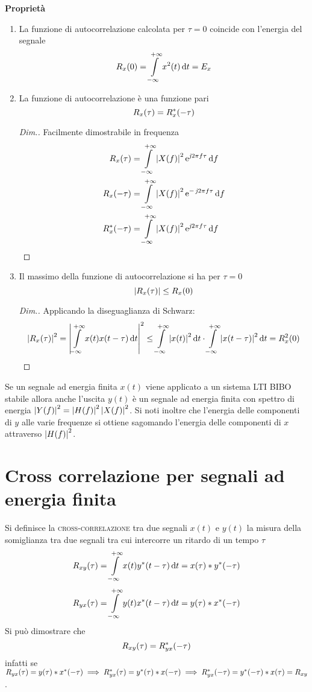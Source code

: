 \textbf{Proprietà}
\begin{enumerate}
\item La funzione di autocorrelazione calcolata per $\tau=0$ coincide con l'energia del segnale
\[
	R_x(0)=\int\limits_{-\infty}^{+\infty}{x^2(t)}{\,\mathop{}\!\mathrm{d}{t}}=E_x
\]

\item La funzione di autocorrelazione è una funzione pari
\[
	R_x(\tau)=R_{x}^\ast(-\tau)
\]
\begin{proof}[Dim.]
Facilmente dimostrabile in frequenza
\begin{align*}
	R_x(\tau)&=\int\limits_{-\infty}^{+\infty}{\left|{X(f)}\right|^2\operatorname{e}^{\operatorname{\mathit{j}\!} 2\pi f\tau}}{\,\mathop{}\!\mathrm{d}{f}}\\
	R_x(-\tau)&=\int\limits_{-\infty}^{+\infty}{\left|{X(f)}\right|^2\operatorname{e}^{-\operatorname{\mathit{j}\!} 2\pi f\tau}}{\,\mathop{}\!\mathrm{d}{f}}\\
	R_{x}^\ast(-\tau)&=\int\limits_{-\infty}^{+\infty}{\left|{X(f)}\right|^2\operatorname{e}^{\operatorname{\mathit{j}\!} 2\pi f\tau}}{\,\mathop{}\!\mathrm{d}{f}}
	\qedhere
\end{align*}
\end{proof}

\item Il massimo della funzione di autocorrelazione si ha per $\tau=0$
\[
	\left|{R_x(\tau)}\right|\leq R_x(0)
\]
\begin{proof}[Dim.]
Applicando la diseguaglianza di Schwarz:
\[
	\left|{R_x(\tau)}\right|^2=\left|{\int\limits_{-\infty}^{+\infty}{x(t)x(t-\tau)}{\,\mathop{}\!\mathrm{d}{t}}}\right|^2\leq\int\limits_{-\infty}^{+\infty}{\left|{x(t)}\right|^2}{\,\mathop{}\!\mathrm{d}{t}}\cdot\int\limits_{-\infty}^{+\infty}{\left|{x(t-\tau)}\right|^2}{\,\mathop{}\!\mathrm{d}{t}}=R_x^2(0)
	\qedhere
\]
\end{proof}
\end{enumerate}

\begin{nota}
	Se un segnale ad energia finita $x(t)$ viene applicato a un sistema LTI BIBO stabile allora anche l'uscita $y(t)$ è un segnale ad energia finita con spettro di energia $\left|{Y(f)}\right|^2=\left|{H(f)}\right|^2\left|{X(f)}\right|^2$. Si noti inoltre che l'energia delle componenti di $y$ alle varie frequenze si ottiene sagomando l'energia delle componenti di $x$ attraverso $\left|{H(f)}\right|^2$.
\end{nota}

\section{Cross correlazione per segnali ad energia finita}
Si definisce la \textsc{cross-correlazione} tra due segnali $x(t)$ e $y(t)$ la misura della somiglianza tra due segnali tra cui intercorre un ritardo di un tempo $\tau$
\begin{equation}
	R_{xy}(\tau)=\int\limits_{-\infty}^{+\infty}{x(t){y}^\ast(t-\tau)}{\,\mathop{}\!\mathrm{d}{t}}=x(\tau)\ast {y}^\ast(-\tau)
\end{equation}
\begin{equation}
	R_{yx}(\tau)=\int\limits_{-\infty}^{+\infty}{y(t){x}^\ast(t-\tau)}{\,\mathop{}\!\mathrm{d}{t}}=y(\tau)\ast {x}^\ast(-\tau)
\end{equation}
Si può dimostrare che 
\[
	R_{xy}(\tau)=R_{yx}^\ast(-\tau)
\]
infatti se $R_{yx}(\tau)=y(\tau)\ast {x}^\ast(-\tau)\implies R_{yx}^\ast(\tau)={y}^\ast(\tau)\ast x(-\tau)\implies R_{yx}^\ast(-\tau)={y}^\ast(-\tau)\ast x(\tau)=R_{xy}$.

